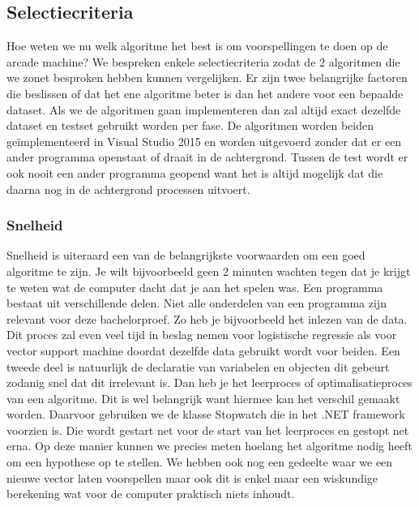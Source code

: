 \subsection{Selectiecriteria}
\label{sec:Selectiecriteria}
Hoe weten we nu welk algoritme het best is om voorspellingen te doen op de arcade machine? We bespreken enkele selectiecriteria zodat de 2 algoritmen die we zonet besproken hebben kunnen vergelijken. 
Er zijn twee belangrijke factoren die beslissen of dat het ene algoritme beter is dan het andere voor een bepaalde dataset. 
Als we de algoritmen gaan implementeren dan zal altijd exact dezelfde dataset en testset gebruikt worden per fase. De algoritmen worden beiden geïmplementeerd in Visual Studio 2015 en worden uitgevoerd zonder dat er een ander programma openstaat of draait in de achtergrond. Tussen de test wordt er ook nooit een ander programma geopend want het is altijd mogelijk dat die daarna nog in de achtergrond processen uitvoert. 

\subsubsection{Snelheid}
Snelheid is uiteraard een van de belangrijkste voorwaarden om een goed algoritme te zijn. Je wilt bijvoorbeeld geen 2 minuten wachten tegen dat je krijgt te weten wat de computer dacht dat je aan het spelen was. Een programma bestaat uit verschillende delen. Niet alle onderdelen van een programma zijn relevant voor deze bachelorproef. Zo heb je bijvoorbeeld het inlezen van de data. Dit proces zal even veel tijd in beslag nemen voor logistische regressie als voor vector support machine doordat dezelfde data gebruikt wordt voor beiden. Een tweede deel is natuurlijk de declaratie van variabelen en objecten dit gebeurt zodanig snel dat dit irrelevant is.\newline
Dan heb je het leerproces of optimalisatieproces van een algoritme. Dit is wel belangrijk want hiermee kan het verschil gemaakt worden. Daarvoor gebruiken we de klasse Stopwatch die in het .NET framework voorzien is. Die wordt gestart net voor de start van het leerproces en gestopt net erna. Op deze manier kunnen we precies meten hoelang het algoritme nodig heeft om een hypothese op te stellen. \newline
We hebben ook nog een gedeelte waar we een nieuwe vector laten voorspellen maar ook dit is enkel maar een wiskundige berekening wat voor de computer praktisch niets inhoudt. 

